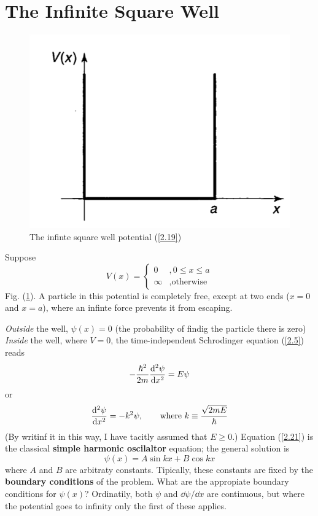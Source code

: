 \section{The Infinite Square Well}
\begin{figure}[h!]
	\begin{center}
		\includegraphics[scale=0.5]{fig/01.png}
		\caption{The infinte square well potential (\ref{2.19})}
		\label{fig:2.1}
	\end{center}	
\end{figure}

Suppose
\begin{equation}\label{2.19}
	V(x)=\left\{\begin{array}{lc}
		0&,0\leq x\leq a\\ \infty & \mbox{,otherwise}\end{array}
		\right.
\end{equation}
Fig. (\ref{fig:2.1}). A particle in this potential is completely free, except at two ends ($x=0$ and $x=a$), where an infinte force prevents it from escaping.

\textit{Outside} the well, $\psi(x)=0$ (the probability of findig the particle there is zero) \textit{Inside} the well, where $V=0$, the time-independent Schrodinger equation (\ref{2.5}) reads
\begin{equation}\label{2.20}
	-\frac{\hbar^2}{2m}\dv[2]{\psi}{x}=E\psi
\end{equation}
or
\begin{equation}\label{2.21}
	\dv[2]{\psi}{x}=-k^2\psi,\qquad \mbox{where } k\equiv\frac{\sqrt{2mE}}{\hbar}
\end{equation}
(By writinf it in this way, I have tacitly assumed that $E\geq 0$.) Equation (\ref{2.21}) is the classical \textbf{simple harmonic oscilaltor} equation; the general solution is
\begin{equation}\label{2.22}
	\psi(x)=A\sin kx + B\cos kx
\end{equation}
where $A$ and $B$ are arbitraty constants. Tipically, these constants are fixed by the \textbf{boundary conditions} of the problem. What are the appropiate boundary conditions for $\psi(x)$? Ordinatily, both $\psi$ and $\dd \psi/\dd x$ are continuous, but where the potential goes to infinity only the first of these applies.

